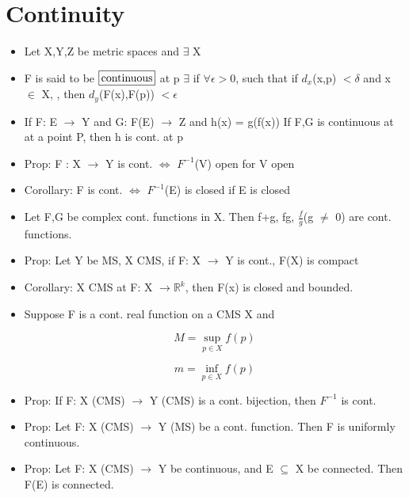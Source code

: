 \documentclass[11pt]{article}
\newcommand{\boxinate}[1]{\framebox[1.1\width]{#1}}
\begin{document}
\section{Continuity}

\begin{itemize}

\item Let X,Y,Z be metric spaces and $\exists$  X

\item F is said to be $\boxinate{continuous}$ at p $\exists$ if $\forall
  \epsilon >$0, such that if $d_{x}$(x,p) $< \delta$ and x $\in$ X, , then
  $d_y$(F(x),F(p)) $< \epsilon$


\item If F: E $\rightarrow$  Y and G: F(E) $\rightarrow$ Z and h(x) = g(f(x))
  If F,G is continuous at at a point P, then h is cont. at p



\item Prop: F : X $\rightarrow$ Y is cont. $\iff$ $F^{-1}$(V) open for V open


\item Corollary: F is cont. $\iff$ $F^{-1}$(E) is closed if E is closed

\item Let F,G be complex cont. functions in X. Then f+g, fg, $\frac{f}{g}$(g
  $\neq$ 0) are cont. functions.


\item Prop: Let Y be MS, X CMS, if F: X $\rightarrow$ Y is cont., F(X) is
  compact


\item Corollary: X CMS at F: X $\rightarrow \mathbb{R}^k$, then F(x) is closed
  and bounded.

\item Suppose F is a cont. real function on a CMS X and

  $$M = \sup_{p \in X}f(p)$$

  $$m = \inf_{p \in X}f(p)$$

\item Prop: If F: X (CMS) $\rightarrow$ Y (CMS) is a cont. bijection, then
  $F^{-1}$ is cont.

\item Prop: Let F: X (CMS) $\rightarrow$ Y (MS) be a cont. function. Then F is
  uniformly continuous.

\item Prop: Let F: X (CMS) $\rightarrow$ Y be continuous, and E $\subseteq$ X
  be connected. Then F(E) is connected.


\end{itemize}
\end{document}
